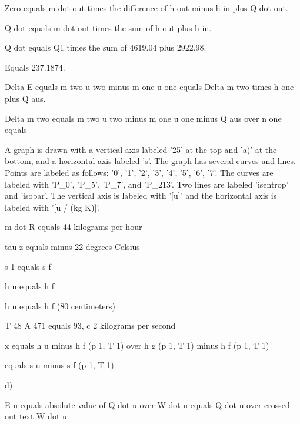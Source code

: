 Zero equals m dot out times the difference of h out minus h in plus Q dot out.  

Q dot equals m dot out times the sum of h out plus h in.  

Q dot equals Q1 times the sum of 4619.04 plus 2922.98.  

Equals 237.1874.

Delta E equals m two u two minus m one u one equals Delta m two times h one plus Q aus.  

Delta m two equals m two u two minus m one u one minus Q aus over n one equals

A graph is drawn with a vertical axis labeled '25' at the top and 'a)' at the bottom, and a horizontal axis labeled 's'. The graph has several curves and lines. Points are labeled as follows: '0', '1', '2', '3', '4', '5', '6', '7'. The curves are labeled with 'P_0', 'P_5', 'P_7', and 'P_213'. Two lines are labeled 'isentrop' and 'isobar'. The vertical axis is labeled with '[u]' and the horizontal axis is labeled with '[u / (kg K)]'.

m dot R equals 44 kilograms per hour

tau z equals minus 22 degrees Celsius

s 1 equals s f

h u equals h f

h u equals h f (80 centimeters)

T 48 A 471 equals 93, c 2 kilograms per second

x equals h u minus h f (p 1, T 1) over h g (p 1, T 1) minus h f (p 1, T 1)

equals s u minus s f (p 1, T 1)

d)

E u equals absolute value of Q dot u over W dot u equals Q dot u over crossed out text W dot u